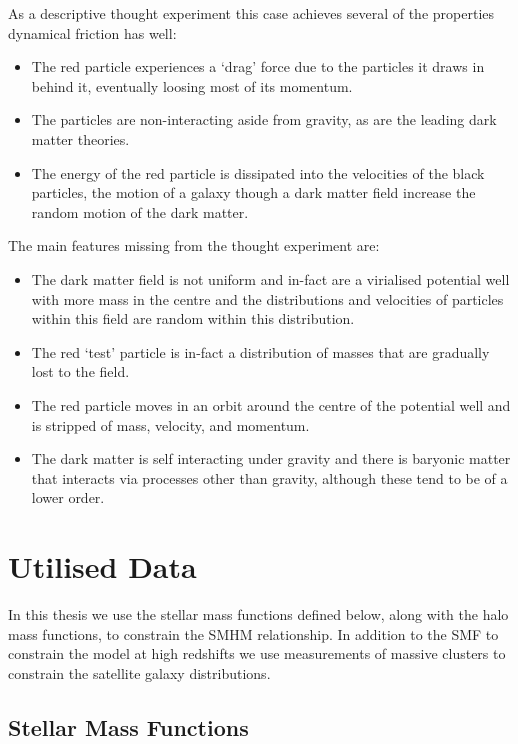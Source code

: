 As a descriptive thought experiment this case achieves several of the properties dynamical friction has well:
\begin{itemize}
    \item The red particle experiences a `drag' force due to the particles it draws in behind it, eventually loosing most of its momentum.
    \item The particles are non-interacting aside from gravity, as are the leading dark matter theories.
    \item The energy of the red particle is dissipated into the velocities of the black particles, the motion of a galaxy though a dark matter field increase the random motion of the dark matter.
\end{itemize}
The main features missing from the thought experiment are:
\begin{itemize}
    \item The dark matter field is not uniform and in-fact are a virialised potential well with more mass in the centre and the distributions and velocities of particles within this field are random within this distribution.
    \item The red `test' particle is in-fact a distribution of masses that are gradually lost to the field.
    \item The red particle moves in an orbit around the centre of the potential well and is stripped of mass, velocity, and momentum.
    \item The dark matter is self interacting under gravity and there is baryonic matter that interacts via processes other than gravity, although these tend to be of a lower order.
\end{itemize}



\section{Utilised Data}

In this thesis we use the stellar mass functions defined below, along with the halo mass functions, to constrain the SMHM relationship. In addition to the SMF to constrain the model at high redshifts we use measurements of massive clusters to constrain the satellite galaxy distributions.

\subsection{Stellar Mass Functions}
\label{subsec:SMF}

